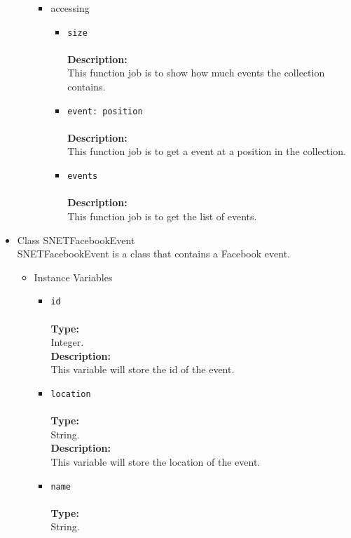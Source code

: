 \begin{itemize}
\begin{itemize}
\begin{itemize}
\item accessing
\label{sec-1-4-2-12-2-3}%
\begin{itemize}
\item \verb~size~\\\\
\textbf{Description:}\\
      This function job is to show how much events the collection contains.\\
\item \verb~event: position~\\\\
\textbf{Description:}\\
      This function job is to get a event at a position in the collection.\\
\item \verb~events~\\\\
\textbf{Description:}\\
      This function job is to get the list of events.
\end{itemize}

\end{itemize} %
\end{itemize} %

\item Class SNETFacebookEvent\\
\label{sec-1-4-2-13}%
SNETFacebookEvent is a class that contains a Facebook event.
   
\begin{itemize}

\item Instance Variables
\label{sec-1-4-2-13-1}%
\begin{itemize}
\item \verb~id~\\\\
\textbf{Type:}\\
     Integer.\\

     \textbf{Description:}\\
     This variable will store the id of the event.\\
\item \verb~location~\\\\
\textbf{Type:}\\
     String.\\

     \textbf{Description:}\\
     This variable will store the location of the event.\\
\item \verb~name~\\\\
\textbf{Type:}\\
     String.\\


\end{itemize}
\end{itemize}
\end{itemize}
